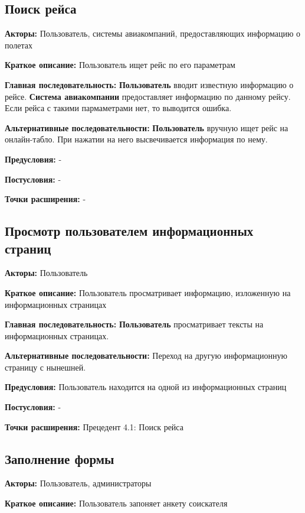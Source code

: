 \subsection{Поиск рейса}

\textbf{Акторы:} Пользователь, системы авиакомпаний, предоставляющих информацию о полетах

\textbf{Краткое описание:} Пользователь ищет рейс по его параметрам

\textbf{Главная последовательность:} \textbf{Пользователь} вводит известную информацию о рейсе. \textbf{Система авиакомпании} 
предоставляет информацию по данному рейсу. Если рейса с такими пармаметрами нет, то выводится ошибка.

\textbf{Альтернативные последовательности:} \textbf{Пользователь} вручную ищет рейс на онлайн-табло. При нажатии
на него высвечивается информация по нему.

\textbf{Предусловия:} -

\textbf{Постусловия:} -

\textbf{Точки расширения:} -




\subsection{Просмотр пользователем информационных страниц}

\textbf{Акторы:} Пользователь

\textbf{Краткое описание:} Пользователь просматривает информацию, изложенную на информационных страницах

\textbf{Главная последовательность:} \textbf{Пользователь} просматривает тексты на информационных
страницах.

\textbf{Альтернативные последовательности:} Переход на другую информационную страницу с нынешней.

\textbf{Предусловия:} Пользователь находится на одной из информационных страниц

\textbf{Постусловия:} -

\textbf{Точки расширения:} Прецедент 4.1: Поиск рейса




\subsection{Заполнение формы}

\textbf{Акторы:} Пользователь, администраторы

\textbf{Краткое описание:} Пользователь запоняет анкету соискателя

